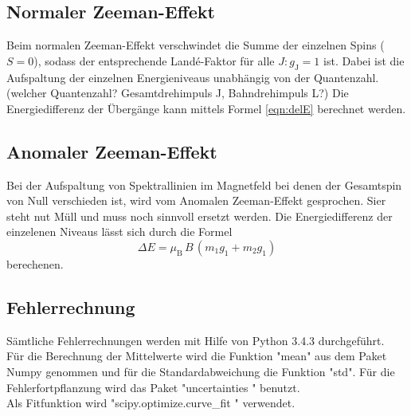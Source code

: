 \subsection{Normaler Zeeman-Effekt}
Beim normalen Zeeman-Effekt verschwindet die Summe der einzelnen Spins ($S=0$), sodass der entsprechende Landé-Faktor für alle $J : g_\text{J} = 1$ ist. Dabei ist die Aufspaltung der einzelnen Energieniveaus unabhängig von der Quantenzahl.(welcher Quantenzahl? Gesamtdrehimpuls J, Bahndrehimpuls L?) Die Energiedifferenz der Übergänge kann mittels Formel \ref{eqn:delE} berechnet werden.
\subsection{Anomaler Zeeman-Effekt}
Bei der Aufspaltung von Spektrallinien im Magnetfeld bei denen der Gesamtspin von Null verschieden ist, wird vom Anomalen Zeeman-Effekt gesprochen. Sier steht nut Müll und muss noch sinnvoll ersetzt werden. Die Energiedifferenz der einzelenen Niveaus lässt sich durch die Formel
\begin{equation}
  \Delta E = \mu_\text{B}\,B\,(m_1 g_1 + m_2 g_1)
  \label{eqn:dE}
\end{equation}
berechenen.



\subsection{Fehlerrechnung}
Sämtliche Fehlerrechnungen werden mit Hilfe von Python 3.4.3 durchgeführt. \\
Für die Berechnung der Mittelwerte wird die Funktion "mean" aus dem Paket Numpy genommen und für die Standardabweichung die Funktion "std". Für die Fehlerfortpflanzung wird das Paket "uncertainties \cite{uncertainties}" benutzt. \\
Als Fitfunktion wird "scipy.optimize.curve\_fit \cite{scipy}" verwendet.
